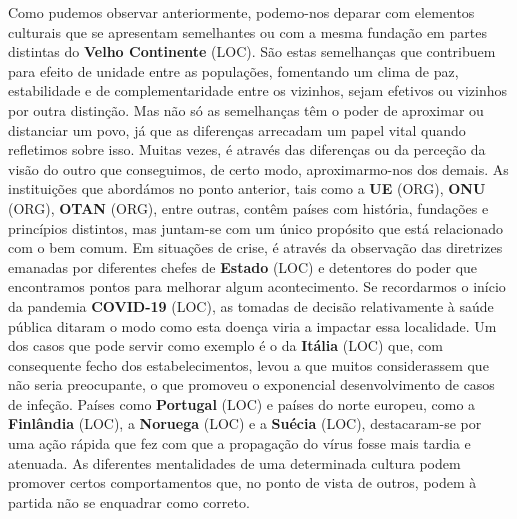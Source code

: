 \documentclass[12pt,a4paper]{article}
\begin{document}
Como  pudemos  observar  anteriormente,  podemo-nos  deparar  com  elementos culturais que se apresentam semelhantes ou com a mesma fundação em partes distintas do \textbf{Velho Continente} (LOC). São estas semelhanças que contribuem para efeito de unidade entre as populações, fomentando um clima de paz, estabilidade e de complementaridade entre os vizinhos, sejam efetivos ou vizinhos por outra distinção. Mas não só as semelhanças têm o poder de aproximar ou distanciar um povo, já que as diferenças arrecadam um papel vital quando refletimos sobre isso. Muitas vezes, é através das diferenças ou da perceção da  visão  do  outro  que  conseguimos,  de  certo  modo,  aproximarmo-nos  dos  demais.  As instituições que abordámos no ponto anterior, tais como a \textbf{UE} (ORG), \textbf{ONU} (ORG), \textbf{OTAN} (ORG), entre outras, contêm  países  com  história,  fundações  e  princípios  distintos,  mas  juntam-se  com  um único propósito que está relacionado com o bem comum. Em situações de crise, é através da observação das diretrizes emanadas por diferentes chefes de \textbf{Estado} (LOC) e  detentores do poder  que  encontramos  pontos  para  melhorar  algum  acontecimento.  Se  recordarmos  o início  da  pandemia  \textbf{COVID-19} (LOC),  as  tomadas  de  decisão  relativamente  à  saúde  pública ditaram  o modo  como  esta doença viria a impactar essa  localidade. Um dos casos  que pode servir como exemplo é o da \textbf{Itália} (LOC) que, com consequente fecho dos estabelecimentos, levou  a  que  muitos  considerassem  que  não  seria  preocupante,  o  que  promoveu  o exponencial desenvolvimento de casos de infeção. Países como \textbf{Portugal} (LOC) e países do norte europeu, como a \textbf{Finlândia} (LOC), a \textbf{Noruega} (LOC) e a \textbf{Suécia} (LOC), destacaram-se por uma ação rápida que fez  com  que  a  propagação  do  vírus  fosse  mais  tardia  e  atenuada.  As  diferentes mentalidades de uma determinada cultura podem promover certos comportamentos que, no ponto de vista de outros, podem à partida não se enquadrar como correto.
\end{document}

